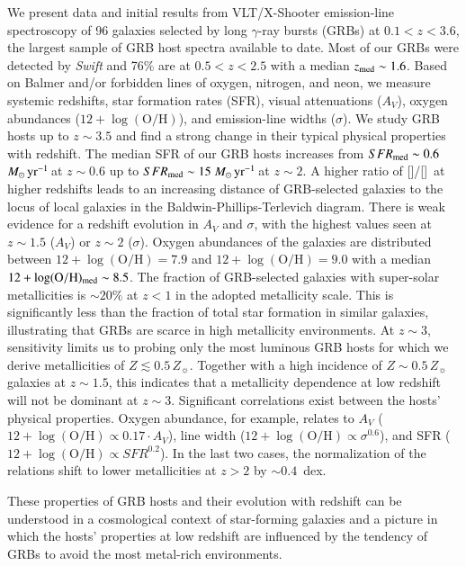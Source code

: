 \documentclass[traditabstract, longauth]{aa}
\newcommand{\oh}{12+\log(\mathrm{O/H})}
\newcommand{\oii}{[\ion{O}{ii}]}
\newcommand{\oiii}{[\ion{O}{iii}]}
\newcommand{\Msunyr}{$M_\odot\,\rm{yr}^{-1}$}
\begin{document}
\abstract
{We present data and initial results from VLT/X-Shooter emission-line spectroscopy of {96} galaxies selected by long $\gamma$-ray bursts (GRBs) at $0.1<z<3.6$, the largest sample of GRB host spectra available to date. Most of our GRBs were detected by \textit{Swift} and 76\% are at $0.5<z<2.5$ with a median $z_{\rm{med}}\sim1.6$. Based on Balmer and/or forbidden lines of oxygen, nitrogen, and neon, we measure systemic redshifts, star formation rates (SFR), visual attenuations ($A_V$), oxygen abundances ($\oh$), and emission-line widths ($\sigma$). We study GRB hosts up to $z\sim3.5$ and find a strong change in their typical physical properties with redshift. The median SFR of our GRB hosts increases from $SFR_{\rm{med}}\sim0.6$\,\Msunyr\,at $z\sim0.6$ up to $SFR_{\rm{med}}\sim15$\,\Msunyr\,at $z\sim2$. A higher ratio of \oiii/\oii\, at higher redshifts leads to an increasing distance of GRB-selected galaxies to the locus of local galaxies in the Baldwin-Phillips-Terlevich diagram. There is weak evidence for a redshift evolution in $A_V$ and $\sigma$, with the highest values seen at $z\sim1.5$ ($A_V$) or $z\sim2$ ($\sigma$). {Oxygen abundances of the galaxies are distributed between $\oh=7.9$ and $\oh=9.0$ with a median $\oh_{\rm{med}}\sim 8.5$. The fraction of GRB-selected galaxies with super-solar metallicities is $\sim 20\%$ at $z<1$ in the adopted metallicity scale.}  This is significantly less than the fraction of total star formation in similar galaxies, illustrating that GRBs are scarce in high metallicity environments. At $z\sim3$, sensitivity limits us to probing only the most luminous GRB hosts for which we derive metallicities of $Z\lesssim0.5\,Z_{\sun}$. Together with a high incidence of $Z\sim0.5\,Z_{\sun}$ galaxies at $z\sim1.5$, this indicates that a metallicity dependence at low redshift will not be dominant at $z\sim3$. Significant correlations exist between the hosts' physical properties. Oxygen abundance, for example, relates to $A_V$ ($\oh \propto 0.17\cdot A_V$), line width ($\oh \propto\sigma^{0.6}$), and SFR ($\oh\propto SFR^{0.2}$). In the last two cases, the normalization of the relations shift to lower metallicities at $z>2$ by $\sim0.4$~dex. 

These properties of GRB hosts and their evolution with redshift can be understood in a cosmological context of star-forming galaxies and a picture in which the hosts' properties at low redshift are influenced by the tendency of GRBs to {avoid the most metal-rich environments}.}


\maketitle
\end{document}
